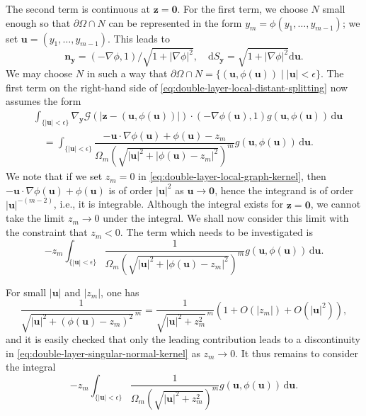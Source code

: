 The second term is continuous at $\bm{z}=\bm{0}$. For the first term, we choose $N$ small enough so that $\partial\Omega\cap N$ can be represented in the form $y_m=\phi(y_1,\ldots,y_{m-1})$; we set $\bm{u}=(y_1,\ldots,y_{m-1})$. This leads to
\begin{equation}\label{eq:boundary-graph-normal-surface-measure}
\bm{n}_{\bm{y}}=(-\nabla\phi,1)/\sqrt{1+|\nabla\phi|^2},\quad\mathrm{d}S_{\bm{y}}=\sqrt{1+|\nabla\phi|^2}\mathrm{d}\bm{u}.
\end{equation}
We may choose $N$ in such a way that $\partial\Omega\cap N=\{(\bm{u},\phi(\bm{u}))\mid|\bm{u}|<\epsilon\}$. The first term on the right-hand side of \eqref{eq:double-layer-local-distant-splitting} now assumes the form
\begin{equation}\label{eq:double-layer-local-graph-kernel}
\begin{aligned}
&\int_{\{|\bm{u}|<\epsilon\}}\nabla_{\bm{y}}\mathcal{G}(|\bm{z}-(\bm{u},\phi(\bm{u}))|)\cdot(-\nabla\phi(\bm{u}),1)g(\bm{u},\phi(\bm{u}))\,\mathrm{d}\bm{u}\\
&\quad=\int_{\{|\bm{u}|<\epsilon\}}\dfrac{-\bm{u}\cdot\nabla\phi(\bm{u})+\phi(\bm{u})-z_m}
{\Omega_m(\sqrt{|\bm{u}|^2+|\phi(\bm{u})-z_m|^2})^m}g(\bm{u},\phi(\bm{u}))\,\mathrm{d}\bm{u}.
\end{aligned}
\end{equation}
We note that if we set $z_m=0$ in \eqref{eq:double-layer-local-graph-kernel}, then $-\bm{u}\cdot\nabla\phi(\bm{u})+\phi(\bm{u})$ is of order $|\bm{u}|^2$ as $\bm{u}\to\bm{0}$, hence the integrand is of order $|\bm{u}|^{-(m-2)}$, i.e., it is integrable. Although the integral exists for $\bm{z}=\bm{0}$, we cannot take the limit $z_m\to0$ under the integral. We shall now consider this limit with the constraint that $z_m<0$. The term which needs to be investigated is
\begin{equation}\label{eq:double-layer-singular-normal-kernel}
-z_m\int_{\{|\bm{u}|<\epsilon\}}\dfrac1{\Omega_m(\sqrt{|\bm{u}|^2+|\phi(\bm{u})-z_m|^2})^m}g(\bm{u},\phi(\bm{u}))\,\mathrm{d}\bm{u}.
\end{equation}


For small $|\bm{u}|$ and $|z_m|$, one has
\begin{equation}\label{eq:double-layer-graph-denominator-expansion}
\dfrac1{\sqrt{|\bm{u}|^2+(\phi(\bm{u})-z_m)^2}^{\,m}}=\dfrac1{\sqrt{|\bm{u}|^2+z_m^2}^{\,m}}(1+O(|z_m|)+O(|\bm{u}|^2)),
\end{equation}
and it is easily checked that only the leading contribution leads to a discontinuity in \eqref{eq:double-layer-singular-normal-kernel} as $z_m\to0$. It thus remains to consider the integral
\begin{equation}\label{eq:double-layer-leading-normal-kernel}
-z_m\int_{\{|\bm{u}|<\epsilon\}}\dfrac1{\Omega_m(\sqrt{|\bm{u}|^2+z_m^2})^m}g(\bm{u},\phi(\bm{u}))\,\mathrm{d}\bm{u}.
\end{equation}


